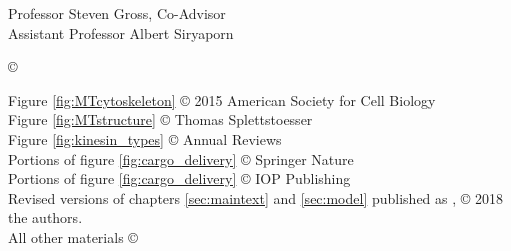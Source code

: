 




\othercommitteemembers
{
  Professor Steven Gross, Co-Advisor\\
  Assistant Professor Albert Siryaporn
}


\copyrightdeclaration
{
  {\copyright} {\Degreeyear} \Authorname
}

 \prepublishedcopyrightdeclaration
 {
 	Figure \ref{fig:MTcytoskeleton} {\copyright} 2015 American Society for Cell Biology \\
	Figure \ref{fig:MTstructure} {\copyright} Thomas Splettstoesser \\
	Figure \ref{fig:kinesin_types} {\copyright} Annual Reviews \\
	Portions of figure \ref{fig:cargo_delivery} {\copyright} Springer Nature \\
	Portions of figure \ref{fig:cargo_delivery} {\copyright} IOP Publishing \\
	Revised versions of chapters \ref{sec:maintext} and \ref{sec:model} published as \cite{Bergman2018}, {\copyright} 2018 the authors. \\
 	All other materials {\copyright} {\Degreeyear} \Authorname
 }

%  

